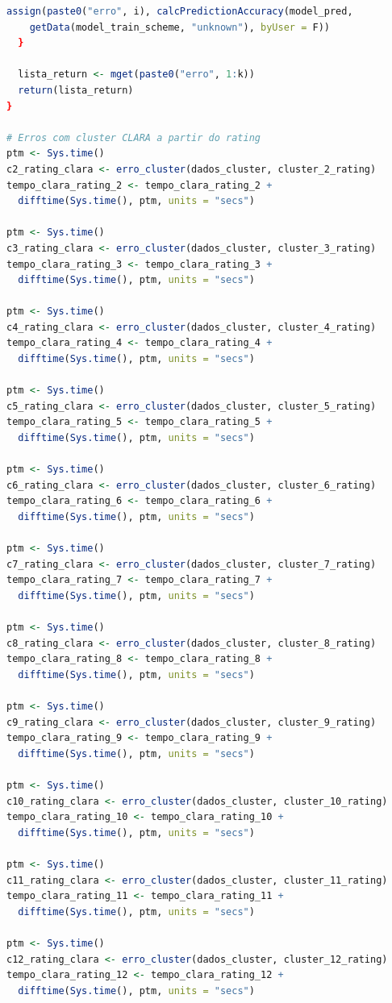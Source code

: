 \documentclass[12pt,a4paper,header]{abnt}
\begin{document}
\begin{lstlisting}[language=R]
    assign(paste0("erro", i), calcPredictionAccuracy(model_pred, 
    getData(model_train_scheme, "unknown"), byUser = F))
  }
  
  lista_return <- mget(paste0("erro", 1:k))
  return(lista_return)
}

# Erros com cluster CLARA a partir do rating
ptm <- Sys.time()
c2_rating_clara <- erro_cluster(dados_cluster, cluster_2_rating)
tempo_clara_rating_2 <- tempo_clara_rating_2 + 
  difftime(Sys.time(), ptm, units = "secs")

ptm <- Sys.time()
c3_rating_clara <- erro_cluster(dados_cluster, cluster_3_rating)
tempo_clara_rating_3 <- tempo_clara_rating_3 + 
  difftime(Sys.time(), ptm, units = "secs")

ptm <- Sys.time()
c4_rating_clara <- erro_cluster(dados_cluster, cluster_4_rating)
tempo_clara_rating_4 <- tempo_clara_rating_4 + 
  difftime(Sys.time(), ptm, units = "secs")

ptm <- Sys.time()
c5_rating_clara <- erro_cluster(dados_cluster, cluster_5_rating)
tempo_clara_rating_5 <- tempo_clara_rating_5 + 
  difftime(Sys.time(), ptm, units = "secs")

ptm <- Sys.time()
c6_rating_clara <- erro_cluster(dados_cluster, cluster_6_rating)
tempo_clara_rating_6 <- tempo_clara_rating_6 + 
  difftime(Sys.time(), ptm, units = "secs")
  
ptm <- Sys.time()
c7_rating_clara <- erro_cluster(dados_cluster, cluster_7_rating)
tempo_clara_rating_7 <- tempo_clara_rating_7 + 
  difftime(Sys.time(), ptm, units = "secs")
  
ptm <- Sys.time()
c8_rating_clara <- erro_cluster(dados_cluster, cluster_8_rating)
tempo_clara_rating_8 <- tempo_clara_rating_8 + 
  difftime(Sys.time(), ptm, units = "secs")  
  
ptm <- Sys.time()
c9_rating_clara <- erro_cluster(dados_cluster, cluster_9_rating)
tempo_clara_rating_9 <- tempo_clara_rating_9 + 
  difftime(Sys.time(), ptm, units = "secs")
  
ptm <- Sys.time()
c10_rating_clara <- erro_cluster(dados_cluster, cluster_10_rating)
tempo_clara_rating_10 <- tempo_clara_rating_10 + 
  difftime(Sys.time(), ptm, units = "secs")  

ptm <- Sys.time()
c11_rating_clara <- erro_cluster(dados_cluster, cluster_11_rating)
tempo_clara_rating_11 <- tempo_clara_rating_11 + 
  difftime(Sys.time(), ptm, units = "secs")
  
ptm <- Sys.time()
c12_rating_clara <- erro_cluster(dados_cluster, cluster_12_rating)
tempo_clara_rating_12 <- tempo_clara_rating_12 + 
  difftime(Sys.time(), ptm, units = "secs")
  

\end{lstlisting}
\end{document}
